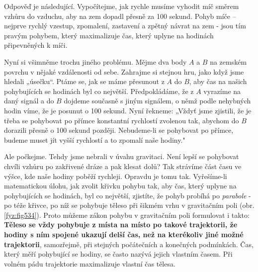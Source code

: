 {    Odpověď je následující. Vypočítejme, jak rychle musíme vyhodit míč směrem vzhůru do vzduchu, 
    aby na zem dopadl přesně za \num{100} sekund. Pohyb míče – nejprve rychlý vzestup, zpomalení, 
    zastavení a zpětný návrat na zem - jsou tím pravým pohybem, který maximalizuje čas, který 
    uplyne na hodinách připevněných k míči.
    
    Nyní si všimněme trochu jiného problému. Mějme dva body \(A\) a \(B\) na zemském povrchu v 
    nějaké vzdálenosti od sebe. Zahrajme si stejnou hru, jako když jsme hledali „úsečku“. Ptáme se, 
    jak se máme přesunout z \(A\) do \(B\), aby čas na našich pohybujících se hodinách byl co 
    největší. Předpokládáme, že z \(A\) vyrazíme na daný signál a do \(B\) dojdeme současně s jiným 
    signálem, o němž podle nehybných hodin víme, že je posunut o \num{100} sekund. Nyní řekneme: 
    „Vždyť jsme zjistili, že je třeba se pohybovat po přímce konstantní rychlostí zvolenou tak, 
    abychom do \(B\) dorazili přesně o \num{100} sekund později. Nebudeme-li se pohybovat po 
    přímce, budeme muset jít vyšší rychlostí a to zpomalí naše hodiny."
    
    Ale počkejme. Tehdy jsme nebrali v úvahu gravitaci. Není lepší se pohybovat chvíli vzhůru po 
    zakřivené dráze a pak klesat dolů? Tak strávíme část času ve výšce, kde naše hodiny poběží 
    rychleji. Opravdu je tomu tak. Vyřešíme-li matematickou úlohu, jak zvolit křivku pohybu tak, 
    aby čas, který uplyne na pohybujících se hodinách, byl co největší, zjistíte, že pohyb probíhá 
    po \emph{parabole} - po téže křivce, po níž se pohybuje těleso při šikmém vrhu v gravitačním 
    poli (obr. \ref{fyz:fig534}). Proto můžeme zákon pohybu v gravitačním poli formulovat i takto: 
    \textbf{Těleso se vždy pohybuje z místa na místo po takové trajektorii, že hodiny s ním spojené 
    ukazují delší čas, než na kterékoliv jiné možné trajektorii}, samozřejmě, při stejných 
    počátečních a konečných podmínkách. Čas, který měří pohybující se hodiny, se často nazývá 
    jejich vlastním časem. Při volném pádu trajektorie maximalizuje vlastní čas tělesa. 

}
